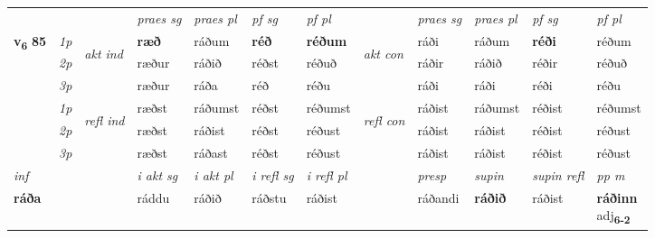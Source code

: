 \begin{longtable}[l]{X>{\footnotesize\itshape}llXXXXlXXXX}
 & &   & \textit{praes sg}  & \textit{praes pl}    & \textit{ pf sg} & \textit{pf pl} & & \textit{praes sg}  & \textit{praes pl}    & \textit{pf sg} & \textit{pf pl }  \\ \cmidrule{4-7} \cmidrule{9-12}
 \multirow{2}{*}{{{\textbf{v{\textsubscript{6}}} \Large{\textbf{85}}}}}  & 1p & \multirow{3}{*}{\begin{turn}{90}\textit{akt ind}\end{turn}} & \textbf{ræð} & ráðum & \textbf{réð} & \textbf{réðum} & \multirow{3}{*}{\begin{turn}{90}\textit{akt con}\end{turn}} &ráði & ráðum & \textbf{réði} & réðum\\*
 & 2p &  &  ræður  & ráðið & réðst & réðuð & & ráðir & ráðið & réðir & réðuð \\*
 & 3p &  & ræður & ráða & réð & réðu & & ráði & ráði& réði & réðu \\*
\cmidrule{4-7} \cmidrule{9-12}
 & 1p & \multirow{3}{*}{\begin{turn}{90}\textit{refl ind}\end{turn}}  & ræðst & ráðumst & réðst & réðumst & \multirow{3}{*}{\begin{turn}{90}\textit{refl con}\end{turn}}  &ráðist & ráðumst & réðist & réðumst \\*
 & 2p &  & ræðst & ráðist & réðst & réðust & &ráðist & ráðist & réðist & réðust \\*
 & 3p  & & ræðst & ráðast & réðst & réðust & & ráðist & ráðist& réðist & réðust \\*
\cmidrule{4-7} \cmidrule{9-12}

   {\textit{inf}} & &  & \textit{i akt sg} & \textit{i akt pl} & \textit{i refl sg} & \textit{i refl pl} && \textit{presp} & \textit{supin} & \textit{supin refl} & \textit{pp m} \\*
  {\textbf{ráða}} & && ráddu  & ráðið & ráðstu & ráðist && ráðandi &  \textbf{ráðið} & ráðist & \specialcell{\textbf{ráðinn} \\ adj\textbf{\textsubscript{6-2}}} \\*

\midrule


\end{longtable}
